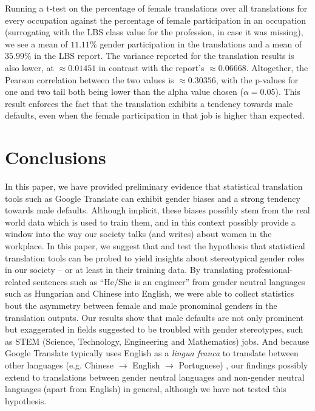 \documentclass[fleqn,10pt]{article}
\begin{document}
Running a t-test on the percentage of female translations over all translations for every occupation against the percentage of female participation in an occupation (surrogating with the LBS class value for the profession, in case it was missing), we see a mean of $11.11\%$ gender participation in the translations and a mean of $35.99\%$ in the LBS report. The variance reported for the translation results is also lower, at $\approx 0.01451$ in contrast with the report's $\approx 0.06668$. Altogether, the Pearson correlation between the two values is $\approx 0.30356$, with the p-values for one and two tail both being lower than the alpha value chosen ($\alpha = 0.05$). This result enforces the fact that the translation exhibits a tendency towards male defaults, even when the female participation in that job is higher than expected.

\section{Conclusions}

In this paper, we have provided preliminary evidence that statistical translation tools such as Google Translate can exhibit gender biases and a strong tendency towards male defaults. Although implicit, these biases possibly stem from the real world data which is used to train them, and in this context possibly provide a window into the way our society talks (and writes) about women in the workplace. In this paper, we suggest that and test the hypothesis that statistical translation tools can be probed to yield insights about stereotypical gender roles in our society -- or at least in their training data. By translating professional-related sentences such as ``He/She is an engineer'' from gender neutral languages such as Hungarian and Chinese into  English, we were able to collect statistics bout the asymmetry between female and male pronominal genders in the translation outputs. Our results show that male defaults are not only prominent but exaggerated in fields suggested to be troubled with gender stereotypes, such as STEM (Science, Technology, Engineering and Mathematics) jobs. And because Google Translate typically uses English as a \emph{lingua franca} to translate between other languages (e.g. Chinese $\rightarrow$ English $\rightarrow$ Portuguese) \citep{LanguageSupportNMT2018,boitet2010mt}, our findings possibly extend to translations between gender neutral languages and non-gender neutral languages (apart from English) in general, although we have not tested this hypothesis.
\end{document}
